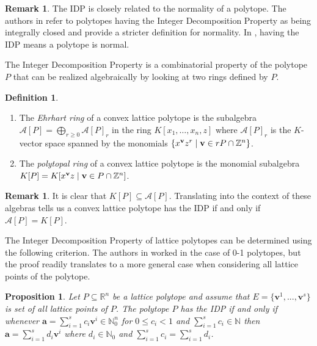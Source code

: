 \documentclass [12pt,a4paper,reqno]{amsart}
\theoremstyle{plain}
\newtheorem{Proposition}[Theorem]{Proposition}
\theoremstyle{definition}
\newtheorem{Assumptions and Discussion}[Theorem]{Assumptions and Discussion}
\newtheorem{Definition}[Theorem]{Definition}
\newtheorem{Remark}[Theorem]{Remark}
\theoremstyle{remark}
\begin{document}
\begin{Remark} 
The IDP is closely related to the normality of a polytope.  The authors in \cite[Chapter 4]{BGPolytopeBook} refer to polytopes having the Integer Decomposition Property as being integrally closed and provide a stricter definition for normality. 
In \cite[Chapter 12]{CCAMillerSturmfelsBook}, having the IDP means a polytope is normal. 
\end{Remark}

The Integer Decomposition Property is a combinatorial property of the polytope $P$ that can be realized algebraically by looking at two rings defined by $P$.


\begin{Definition}  
\begin{enumerate}[a]
    \item The \emph{Ehrhart ring} of a convex lattice polytope is the subalgebra $\mathcal{A}[P] = \bigoplus_{r \geq 0} \mathcal{A}[P]_r$ in the ring $K[x_1,\dots, x_n, z]$ where $\mathcal{A}[P]_r$ is the $K$-vector space spanned by the monomials $\{x^{\bf v}z^r \mid {\bf v} \in rP \cap \mathbb{Z}^n\}$.
    \item The \emph{polytopal ring} of a convex lattice polytope is the monomial subalgebra $K[P] = K[x^{\bf v}z \mid {\bf v} \in P \cap \mathbb{Z}^n]$.
\end{enumerate}
\end{Definition}

\begin{Remark}
It is clear that $K[P]\subseteq \mathcal{A}[P]$. Translating  into the context of these algebras tells us a convex lattice polytope has the IDP if and only if $\mathcal{A}[P] = K[P]$. 
\end{Remark}


The Integer Decomposition Property of lattice polytopes can be determined using the following criterion. The authors in \cite{HL} worked in the case of 0-1 polytopes, but the proof readily translates to a more general case when considering all lattice points of the polytope. 


 
\begin{Proposition}
\label{Normality}\cite[Proposition 3.1]{HL} Let $P\subseteq\mathbb{R}^{n}$
be a lattice polytope and assume that $E=\{\mathbf{v}^{1},...,\mathbf{v}^{s}\}$
is set of all lattice points of $P$. The polytope $P$ has the IDP if and only
if whenever $\mathbf{a}=\sum_{i=1}^{s}c_{i}\mathbf{v}^{i} \in \mathbb{N}_0^n$ for $0\leq c_{i}<1$
and $\sum_{i=1}^{s}c_{i}\in\mathbb{N}$ then $\mathbf{a}=\sum_{i=1}^{s}d_{i}\mathbf{v}^{i}$
where $d_{i}\in\mathbb{N}_0$ and $\sum_{i=1}^{s}c_{i}=\sum_{i=1}^{s}d_{i}$.
\end{Proposition}
\end{document}
